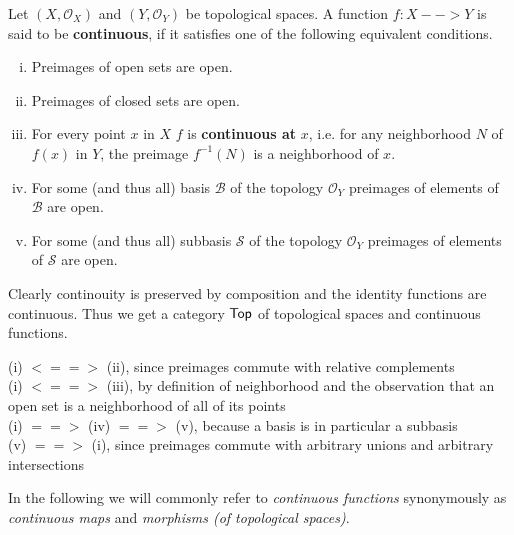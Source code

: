 \begin{definition}
	Let $(X,\mathcal{O}_X)$ and $(Y,\mathcal{O}_Y)$ be topological spaces. A function $f:X-->Y$ is said to be \textbf{continuous}, if it satisfies one of the following equivalent conditions.
	\begin{enumerate}[(i)]
		\item{
			Preimages of open sets are open.
		}
		\item{
			Preimages of closed sets are open.
		}
		\item{
			For every point $x$ in $X$ $f$ is \textbf{continuous at} $x$, i.e. for any neighborhood $N$ of $f(x)$ in $Y$, the preimage $f^{-1}(N)$ is a neighborhood of $x$.
		}
		\item{
			For some (and thus all) basis $\mathcal{B}$ of the topology $\mathcal{O}_Y$ preimages of elements of $\mathcal{B}$ are open.
		}
		\item{
			For some (and thus all) subbasis $\mathcal{S}$ of the topology $\mathcal{O}_Y$ preimages of elements of $\mathcal{S}$ are open.
		}
	\end{enumerate}
	Clearly continouity is preserved by composition and the identity functions are continuous. Thus we get a category $\textsf{Top}$ of topological spaces and continuous functions.
\end{definition}

\begin{sketch}
	(i) $<==>$ (ii), since preimages commute with relative complements\\
	(i) $<==>$ (iii), by definition of neighborhood and the observation that an open set is a neighborhood of all of its points\\
	(i) $==>$ (iv) $==>$ (v), because a basis is in particular a subbasis\\
	(v) $==>$ (i), since preimages commute with arbitrary unions and arbitrary intersections
\end{sketch}

In the following we will commonly refer to \textit{continuous functions} synonymously as \textit{continuous maps} and \textit{morphisms (of topological spaces)}.

